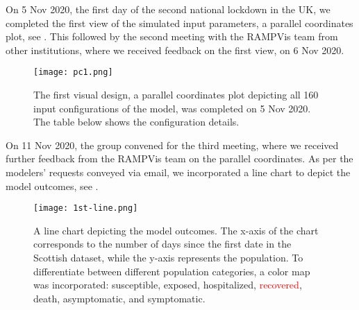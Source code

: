 
On 5 Nov 2020, the first day of the second national lockdown in the UK, we completed the first view of the simulated input parameters, a parallel coordinates plot, see .
This followed by the second meeting with the RAMPVis team from other institutions, where we received feedback on the first view, on 6 Nov 2020.

\begin{figure}[tb!]
    \centering
    \texttt{[image: pc1.png]}
    \caption{The first visual design, a parallel coordinates plot depicting all 160 input configurations of the model, was completed on 5 Nov 2020. The table below shows the configuration details.
    }
    \label{fig:pc1}

\end{figure}


On 11 Nov 2020, the group convened for the third meeting, where we received further feedback from the RAMPVis team on the parallel coordinates. As per the modelers' requests conveyed via email, we incorporated a line chart to depict the model outcomes, see .

\begin{figure}[tb!]
    \centering
    \texttt{[image: 1st-line.png]}
    \caption{A line chart depicting the model outcomes.
    The x-axis of the chart corresponds to the number of days since the first date in the Scottish dataset, while the y-axis represents the population.
    To differentiate between different population categories, a color map was incorporated: \textcolor{DodgerBlue1}{susceptible}, \textcolor{Chocolate1}{exposed}, \textcolor{Green4}{hospitalized}, \textcolor{red}{recovered}, \textcolor{DarkOrchid1}{death}, \textcolor{LightSalmon4}{asymptomatic}, and \textcolor{HotPink1}{symptomatic}.
    }
    \label{fig:1st-line}

\end{figure}


